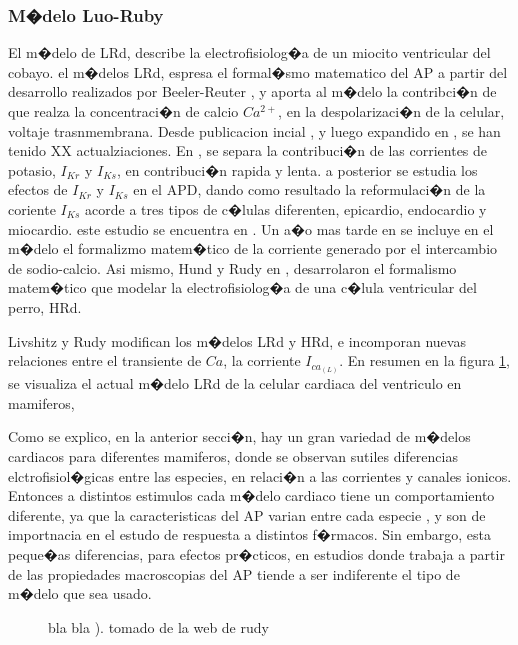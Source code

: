\subsubsection{M�delo Luo-Ruby}

El m�delo de \acf{LRd}, describe la electrofisiolog�a de un miocito ventricular
del cobayo. el m�delos \ac{LRd}, espresa el formal�smo matematico del \ac{AP} a
partir del desarrollo realizados por Beeler-Reuter \cite{beeler1977}, y aporta
al m�delo la contribci�n de que realza la concentraci�n de calcio $Ca^{2+}$,
en la despolarizaci�n de la celular, voltaje trasnmembrana. Desde publicacion
incial \cite{luo1991}, y luego expandido en  \cite{luo1994}, se han tenido XX 
actualziaciones.  En \cite{zeng1995}, se separa la contribuci�n de las
corrientes de potasio, $I_{Kr}$ y $I_{Ks}$, en contribuci�n rapida y lenta.
a posterior se estudia los efectos de $I_{Kr}$ y $I_{Ks}$  en el \ac{APD}, dando
como resultado la reformulaci�n de la coriente $I_{Ks}$ acorde a tres tipos de
c�lulas diferenten, epicardio, endocardio  y miocardio. este estudio se
encuentra en \cite{viswanathan1999}. Un a�o mas tarde en \cite{faber2000} se 
incluye en el m�delo el formalizmo matem�tico de la corriente generado por el intercambio de
sodio-calcio. Asi mismo, Hund y Rudy en \cite{hund2004}, desarrolaron el
formalismo matem�tico que modelar la electrofisiolog�a de una c�lula ventricular
del perro, \ac{HRd}.

 Livshitz y  Rudy \cite{livshitz2007}  modifican los m�delos \ac{LRd} y
 \ac{HRd}, e incomporan nuevas relaciones entre el transiente de $Ca$, la
 corriente $I_{ca_{(L)}}$. En resumen en la figura \ref{fig:modelHRd}, se
 visualiza el actual m�delo  \ac{LRd} de la celular cardiaca del ventriculo en
 mamiferos,
 
 Como se explico, en la anterior secci�n, hay un gran variedad de  m�delos
 cardiacos para diferentes mamiferos, donde se observan sutiles diferencias
 elctrofisiol�gicas entre las especies, en relaci�n a las corrientes y
 canales ionicos. Entonces a distintos estimulos cada m�delo cardiaco
 tiene un comportamiento diferente, ya que la caracteristicas del \ac{AP}
 varian entre cada especie \cite{OHara2012}, y son de  importnacia en el estudo
 de respuesta a distintos f�rmacos. Sin embargo, esta peque�as diferencias,
 para efectos pr�cticos, en estudios donde trabaja a partir de las propiedades
 macroscopias del \ac{AP} tiende a ser indiferente el tipo de m�delo que sea
 usado. 
  
  \begin{figure}[t]
\centering
\caption{bla bla ). tomado de la web de rudy }
  \label{fig:modelHRd}
\end{figure}

